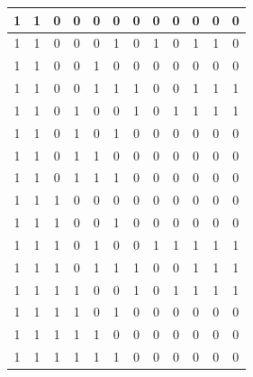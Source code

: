 \documentclass[12pt,a4paper]{article}
\begin{document}
\begin{longtable}{|ccc|ccc||ccc|c|c|c|}
1 & 1 & 0 & 0 & 0 & 0 & 0 & 0 & 0 & 0 & 0 & 0 \\ \hline
1 & 1 & 0 & 0 & 0 & 1 & 0 & 1 & 0 & 1 & 1 & 0 \\ \hline
1 & 1 & 0 & 0 & 1 & 0 & 0 & 0 & 0 & 0 & 0 & 0 \\ \hline
1 & 1 & 0 & 0 & 1 & 1 & 1 & 0 & 0 & 1 & 1 & 1 \\ \hline
1 & 1 & 0 & 1 & 0 & 0 & 1 & 0 & 1 & 1 & 1 & 1 \\ \hline
1 & 1 & 0 & 1 & 0 & 1 & 0 & 0 & 0 & 0 & 0 & 0 \\ \hline
1 & 1 & 0 & 1 & 1 & 0 & 0 & 0 & 0 & 0 & 0 & 0 \\ \hline
1 & 1 & 0 & 1 & 1 & 1 & 0 & 0 & 0 & 0 & 0 & 0 \\ \hline
1 & 1 & 1 & 0 & 0 & 0 & 0 & 0 & 0 & 0 & 0 & 0 \\ \hline
1 & 1 & 1 & 0 & 0 & 1 & 0 & 0 & 0 & 0 & 0 & 0 \\ \hline
1 & 1 & 1 & 0 & 1 & 0 & 0 & 1 & 1 & 1 & 1 & 1 \\ \hline
1 & 1 & 1 & 0 & 1 & 1 & 1 & 0 & 0 & 1 & 1 & 1 \\ \hline
1 & 1 & 1 & 1 & 0 & 0 & 1 & 0 & 1 & 1 & 1 & 1 \\ \hline
1 & 1 & 1 & 1 & 0 & 1 & 0 & 0 & 0 & 0 & 0 & 0 \\ \hline
1 & 1 & 1 & 1 & 1 & 0 & 0 & 0 & 0 & 0 & 0 & 0 \\ \hline
1 & 1 & 1 & 1 & 1 & 1 & 0 & 0 & 0 & 0 & 0 & 0 \\ \hline
\end{longtable}
\end{document}
